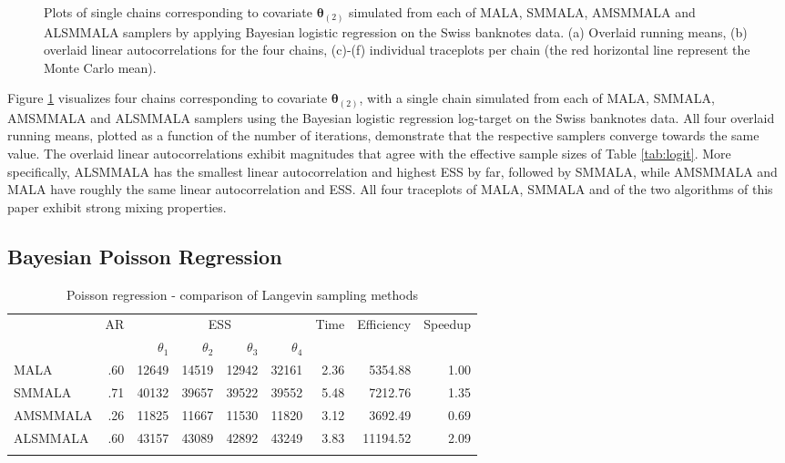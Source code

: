 \documentclass[twoside,11pt]{article}
\begin{document}
{\begin{figure}[t]
	\caption{
		Plots of single chains corresponding to covariate $\boldsymbol{\theta}_{(2)}$ simulated from each of MALA, SMMALA, 
		AMSMMALA and ALSMMALA samplers by applying Bayesian logistic regression on the Swiss banknotes data. (a) Overlaid 
		running means, (b) overlaid linear autocorrelations for the four chains, (c)-(f) individual traceplots per chain (the 
		red horizontal line represent the Monte Carlo mean).
	}
	\label{fig:logit}
\end{figure}

Figure \ref{fig:logit} visualizes four chains corresponding to covariate $\boldsymbol{\theta}_{(2)}$, with a single chain 
simulated from each of MALA, SMMALA, AMSMMALA and ALSMMALA samplers using the Bayesian logistic regression log-target on the 
Swiss banknotes data. All four overlaid running means, plotted as a function of the number of iterations, demonstrate that 
the respective samplers converge towards the same value. The overlaid linear autocorrelations exhibit magnitudes that agree 
with the effective sample sizes of Table \ref{tab:logit}. More specifically, ALSMMALA has the smallest linear 
autocorrelation and highest ESS by far, followed by SMMALA, while AMSMMALA and MALA have roughly the same linear 
autocorrelation and ESS. All four traceplots of MALA, SMMALA and of the two algorithms of this paper exhibit strong mixing 
properties.

\newpage
\subsection{Bayesian Poisson Regression}

\begin{table}
	\caption{Poisson regression - comparison of Langevin sampling methods}
	\label{tab:poisson}
	\begin{tabular}{l|r|rrrr|r|r|r}
		\hline\noalign{\smallskip}
		\multirow{2}{*}{Method} &
		\multirow{2}{*}{AR} &
		\multicolumn{4}{c|}{ESS} &
		\multirow{2}{*}{Time} &
		\multirow{2}{*}{Efficiency} &
		\multirow{2}{*}{Speedup} \\
		& & $\theta_1$ & $\theta_2$ & $\theta_3$ & $\theta_4$ & & & \\
		\noalign{\smallskip}\hline\noalign{\smallskip}
		MALA & .60 & 12649 & 14519 & 12942 & 32161 & 2.36 & 5354.88 & 1.00 \\
		SMMALA & .71 & 40132 & 39657 & 39522 & 39552 & 5.48 & 7212.76 & 1.35 \\
		AMSMMALA & .26 & 11825 & 11667 & 11530 & 11820 & 3.12 & 3692.49 & 0.69 \\
		ALSMMALA & .60 & 43157 & 43089 & 42892 & 43249 & 3.83 & 11194.52 & 2.09 \\
		\noalign{\smallskip}\hline
	\end{tabular}
\end{table}

}
\end{document}
